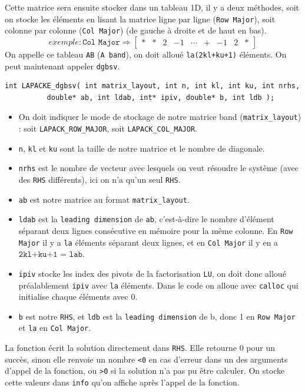 \documentclass{article}
\begin{document}
Cette matrice sera ensuite stocker dans un tableau 1D, il y a deux méthodes, soit on stocke les éléments en lisant la matrice ligne par ligne (\texttt{Row Major}), soit colonne par colonne (\texttt{Col Major}) (de gauche à droite et de haut en bas).
\[ 
	exemple : \texttt{Col Major} \Longrightarrow
	\begin{bmatrix}
	\ast & \ast	& 2 & -1 & \cdots & \texttt{+} & -1 & 2 & \ast
	\end{bmatrix}
\]
On appelle ce tableau \texttt{AB} (\texttt{A band}), on doit alloué \texttt{la(2kl+ku+1)} éléments.
On peut maintenant appeler \texttt{dgbsv}.
\begin{scriptsize}
\begin{verbatim}
int LAPACKE_dgbsv( int matrix_layout, int n, int kl, int ku, int nrhs, 
		  double* ab, int ldab, int* ipiv, double* b, int ldb );
\end{verbatim}
\end{scriptsize}
\begin{itemize}
\item On doit indiquer le mode de stockage de notre matrice band (\texttt{matrix\_layout}) : soit \texttt{LAPACK\_ROW\_MAJOR}, soit \texttt{LAPACK\_COL\_MAJOR}.
\item \texttt{n}, \texttt{kl} et \texttt{ku} sont la taille de notre matrice et le nombre de diagonale.
\item \texttt{nrhs} est le nombre de vecteur avec lesquels on veut résoudre le système (avec des \texttt{RHS} différents), ici on n'a qu'un seul \texttt{RHS}.
\item \texttt{ab} est notre matrice au format \texttt{matrix\_layout}.
\item \texttt{ldab} est la \texttt{leading dimension} de \texttt{ab}, c'est-à-dire le nombre d'élément  séparant deux lignes consécutive en mémoire pour la même colonne. En \texttt{Row Major} il y a \texttt{la} éléments séparant deux lignes, et en \texttt{Col Major} il y en a $\texttt{2kl+ku+1 = lab}$.
\item \texttt{ipiv} stocke les index des pivots de la factorisation \texttt{LU}, on doit donc alloué préalablement \texttt{ipiv} avec \texttt{la} éléments. Dans le code on alloue avec \texttt{calloc} qui initialise chaque éléments avec 0.
\item \texttt{b} est notre \texttt{RHS}, et \texttt{ldb} est la \texttt{leading dimension} de b, donc 1 en \texttt{Row Major} et \texttt{la} en \texttt{Col Major}.
\end{itemize}
La fonction écrit la solution directement dans \texttt{RHS}.
Elle retourne 0 pour un succès, sinon elle renvoie un nombre \texttt{<0} en cas d'erreur dans un des arguments d'appel de la fonction, ou \texttt{>0} si la solution n'a pas pu être calculer. On stocke cette valeurs dans \texttt{info} qu'on affiche après l'appel de la fonction.
\end{document}
